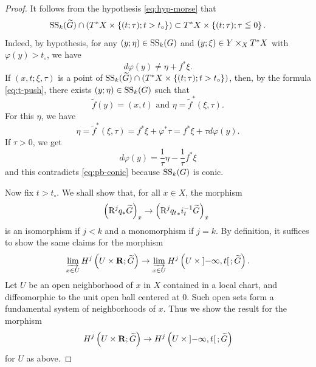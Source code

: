 \begin{proof}
  It follows from the hypothesis \eqref{eq:hyp-morse} that
  \begin{equation}\label{eq:tilde-estimate}
    \muS[k](\widetilde{G})\cap\left(
      \cotb[X]\times\left\{(t;\tau);t>t_{\circ}\right\}
    \right)
    \subset
    \cotb[X]\times\left\{(t;\tau);\tau\leqq0\right\}.
  \end{equation}
  Indeed, by hypothesis, 
  for any \((y;\eta)\in\muS[k](G)\) 
  and \((y;\xi)\in Y\tpb[X]\cotb[X]\) with \(\varphi(y)>t_{\circ}\), 
  we have 
  \begin{equation}\label{eq:pb-conic}
    d\varphi(y)\neq \eta + f^{\ast}\xi.
  \end{equation}
  If \((x,t;\xi,\tau)\) is a point of \(
    \muS[k](\widetilde{G})\cap\left(
      \cotb[X]\times\left\{(t;\tau);t>t_{\circ}\right\}
  \right)\), 
  then, by the formula \eqref{eq:t-push}, 
  there exists \((y;\eta)\in\muS[k](G)\) such that \[
    \tilde{f}(y)=(x,t) 
    \text{ and } 
    \eta=\tilde{f}^{\ast}(\xi,\tau).
  \] For this \(\eta\), we have \[
    \eta
    =\tilde{f}^{\ast}(\xi,\tau)
    =f^{\ast}\xi +\varphi^{\ast}\tau
    =f^{\ast}\xi +\tau d\varphi(y).
  \]
  If \(\tau>0\), we get \[
    d\varphi(y)=\frac{1}{\tau}\eta-\frac{1}{\tau}f^{\ast}\xi
  \] and this contradicts \eqref{eq:pb-conic} 
  because \(\muS[k](G)\) is conic. 

  Now fix \(t>t_{\circ}\).
  We shall show that, for all \(x\in X\), the morphism
  \[
    \left(\Rder[j]{q_{\ast}}\widetilde{G}\right)_{x}\to
    \left(\Rder[j]{{q_{t}}_{\ast}}i_{t}^{-1}\widetilde{G}\right)_{x}\
  \]
  is an isomorphism if \(j<k\) 
  and a monomorphism if \(j=k\). 
  By definition, it suffices to show 
  the same claims for the morphism
  \[
    \indlim[x\in U]H^{j}\left(U\times \rr;\widetilde{G}\right)
    \to
    \indlim[x\in U]H^{j}\left(U\times \lopen-\infty,t\ropen ;\widetilde{G}\right).
  \]
  Let \(U\) be an open neighborhood 
  of \(x\) in \(X\) contained in a local chart, 
  and diffeomorphic to the unit open ball centered at \(0\). 
  Such open sets form a fundamental system 
  of neighborhoods of \(x\). 
  Thus we show the result for the morphism
  \[
    H^{j}\left(U\times \rr;\widetilde{G}\right)
    \to
    H^{j}\left(U\times \lopen-\infty,t\ropen ;\widetilde{G}\right)
  \]
  for \(U\) as above.


\end{proof}
